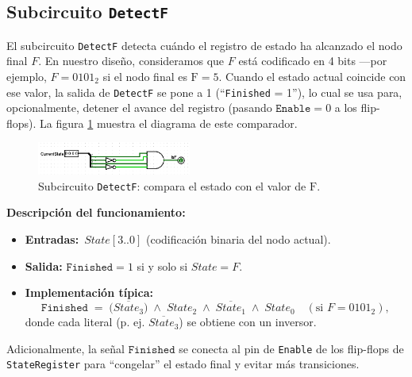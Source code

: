 \documentclass[12pt]{article}
\begin{document}
\newpage

\subsection{Subcircuito \texttt{DetectF}}

El subcircuito \texttt{DetectF} detecta cuándo el registro de estado ha alcanzado el nodo
final \(F\). En nuestro diseño, consideramos que \(F\) está codificado en 4 bits —por ejemplo,
\(F = 0101_{2}\) si el nodo final es \(\text{F} = 5\). Cuando el estado actual coincide con
ese valor, la salida de \texttt{DetectF} se pone a 1 (“\texttt{Finished} = 1”), lo cual se usa
para, opcionalmente, detener el avance del registro (pasando \(\texttt{Enable} = 0\) a los flip-flops).
La figura \ref{fig:detectf} muestra el diagrama de este comparador.

\begin{figure}[H]
  \centering
  \includegraphics[width=0.45\textwidth]{.github/detectf.png}
  \caption{Subcircuito \texttt{DetectF}: compara el estado con el valor de \(\text{F}\).}
  \label{fig:detectf}
\end{figure}

\noindent
\textbf{Descripción del funcionamiento:}
\begin{itemize}
  \item \textbf{Entradas:} \(\,State[3..0]\) (codificación binaria del nodo actual).
  \item \textbf{Salida:} \(\texttt{Finished} = 1\) si y solo si \(State = F\). 
  \item \textbf{Implementación típica:}  
    \[
      \texttt{Finished} 
      \;=\;\bigl( \overline{State_{3}} \bigl) \;\wedge\; State_{2} \;\wedge\; \overline{State_{1}} \;\wedge\; State_{0}
      \quad
      (\text{si } F = 0101_{2}),
    \]
    donde cada literal (p. ej. \(\overline{State_{3}}\)) se obtiene con un inversor.
\end{itemize}

Adicionalmente, la señal \(\texttt{Finished}\) se conecta al pin de \texttt{Enable} de los
flip-flops de \texttt{StateRegister} para “congelar” el estado final y evitar más transiciones.


\newpage

\end{document}
